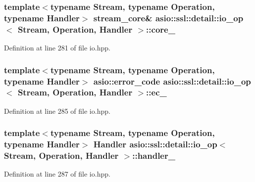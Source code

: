 \subsubsection[{core\+\_\+}]{\setlength{\rightskip}{0pt plus 5cm}template$<$typename Stream, typename Operation, typename Handler$>$ {\bf stream\+\_\+core}\& {\bf asio\+::ssl\+::detail\+::io\+\_\+op}$<$ Stream, Operation, Handler $>$\+::core\+\_\+}\label{classasio_1_1ssl_1_1detail_1_1io__op_a8cfc4ec7786e88fb893239e3afa0d73a}


Definition at line 281 of file io.\+hpp.

\hypertarget{classasio_1_1ssl_1_1detail_1_1io__op_a3b6a192d0f0e5e3af719212a21f0d221}{}
\subsubsection[{ec\+\_\+}]{\setlength{\rightskip}{0pt plus 5cm}template$<$typename Stream, typename Operation, typename Handler$>$ {\bf asio\+::error\+\_\+code} {\bf asio\+::ssl\+::detail\+::io\+\_\+op}$<$ Stream, Operation, Handler $>$\+::ec\+\_\+}\label{classasio_1_1ssl_1_1detail_1_1io__op_a3b6a192d0f0e5e3af719212a21f0d221}


Definition at line 285 of file io.\+hpp.

\hypertarget{classasio_1_1ssl_1_1detail_1_1io__op_a554b84344ad9c6b4d15ac03cc296a2d9}{}
\subsubsection[{handler\+\_\+}]{\setlength{\rightskip}{0pt plus 5cm}template$<$typename Stream, typename Operation, typename Handler$>$ Handler {\bf asio\+::ssl\+::detail\+::io\+\_\+op}$<$ Stream, Operation, Handler $>$\+::handler\+\_\+}\label{classasio_1_1ssl_1_1detail_1_1io__op_a554b84344ad9c6b4d15ac03cc296a2d9}


Definition at line 287 of file io.\+hpp.

\hypertarget{classasio_1_1ssl_1_1detail_1_1io__op_ac9a971480ecb8df84bedc0d891172c63}{}
